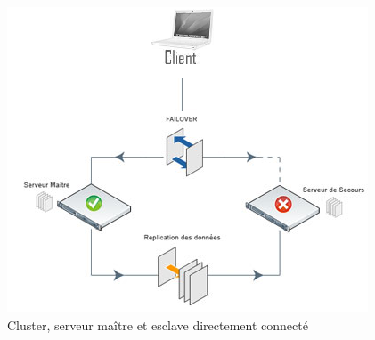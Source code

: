 %		
%


\begin{figure}[htbp]
\centering
 \includegraphics{Images/SchemaCluster.png}
 \caption{Cluster, serveur maître et esclave directement connecté}
 \label{schemacluster}
\end{figure}



